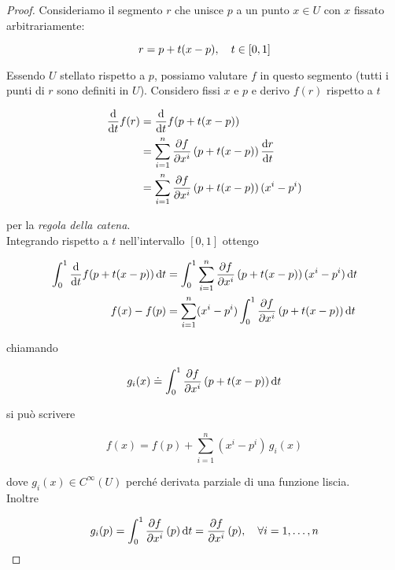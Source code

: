 \begin{proof}
	Consideriamo il segmento $ r $ che  unisce $ p $ a un punto $ x \in U $ con $ x $ fissato  arbitrariamente:
	
	\begin{equation}
		r=p+t(x-p) \qcomma t \in [0,1]
	\end{equation}
	
	Essendo $ U $ stellato rispetto a $ p $, possiamo valutare $ f $ in questo segmento (tutti i punti di $ r $ sono definiti in $ U $). Considero fissi $ x $ e $ p $ e derivo $ f(r) $ rispetto a $ t $
	
	\begin{align}
		\begin{split}
			\dv{t} f(r) &= \dv{t} f(p+t(x-p))\\
			&= \sum_{i=1}^{n} \pdv{f}{x^{i}} \, (p+t(x-p)) \, \dv{r}{t}\\
			&= \sum_{i=1}^{n} \pdv{f}{x^{i}} \, (p+t(x-p)) \, (x^{i}-p^{i})
		\end{split}
	\end{align}
	
	per la \textit{regola della catena}.\\
	Integrando rispetto a $ t $ nell'intervallo $ [0,1] $ ottengo
	
	\begin{align}
		\begin{split}
			\int_{0}^{1} \dv{t} f(p+t(x-p)) \dd{t} &= \int_{0}^{1} \sum_{i=1}^{n} \pdv{f}{x^{i}} \, (p+t(x-p)) \, (x^{i}-p^{i}) \dd{t}\\
			f(x) - f(p)&= \sum_{i=1}^{n} (x^{i}-p^{i}) \int_{0}^{1} \pdv{f}{x^{i}} \, (p+t(x-p)) \dd{t}
		\end{split}
	\end{align}
	
	chiamando
	
	\begin{equation}
		g_{i}(x) \doteq \int_{0}^{1} \pdv{f}{x^{i}} \, (p+t(x-p)) \dd{t}
	\end{equation}
	
	si può scrivere
	
	\begin{equation}
		f(x)= f(p) + \sum_{i=1}^{n} (x^{i}-p^{i}) \, g_{i}(x)
	\end{equation}
	
	dove $ g_{i}(x) \in C^{\infty}(U) $ perché derivata parziale di una funzione liscia.\\
	Inoltre
	
	\begin{equation}
		g_{i}(p) = \int_{0}^{1} \pdv{f}{x^{i}} \, (p) \dd{t} = \pdv{f}{x^{i}} \, (p) \qcomma \forall i=1,\dots,n
	\end{equation}
\end{proof}

